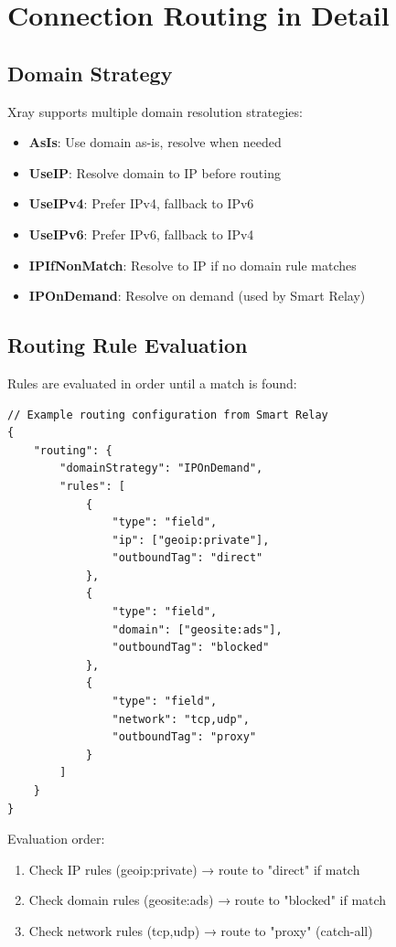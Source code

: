 \section{Connection Routing in Detail}

\subsection{Domain Strategy}

Xray supports multiple domain resolution strategies:

\begin{itemize}
    \item \textbf{AsIs}: Use domain as-is, resolve when needed
    \item \textbf{UseIP}: Resolve domain to IP before routing
    \item \textbf{UseIPv4}: Prefer IPv4, fallback to IPv6
    \item \textbf{UseIPv6}: Prefer IPv6, fallback to IPv4
    \item \textbf{IPIfNonMatch}: Resolve to IP if no domain rule matches
    \item \textbf{IPOnDemand}: Resolve on demand (used by Smart Relay)
\end{itemize}

\subsection{Routing Rule Evaluation}

Rules are evaluated in order until a match is found:

\begin{verbatim}
// Example routing configuration from Smart Relay
{
    "routing": {
        "domainStrategy": "IPOnDemand",
        "rules": [
            {
                "type": "field",
                "ip": ["geoip:private"],
                "outboundTag": "direct"
            },
            {
                "type": "field",
                "domain": ["geosite:ads"],
                "outboundTag": "blocked"
            },
            {
                "type": "field",
                "network": "tcp,udp",
                "outboundTag": "proxy"
            }
        ]
    }
}
\end{verbatim}

Evaluation order:
\begin{enumerate}
    \item Check IP rules (geoip:private) → route to "direct" if match
    \item Check domain rules (geosite:ads) → route to "blocked" if match
    \item Check network rules (tcp,udp) → route to "proxy" (catch-all)
\end{enumerate}

